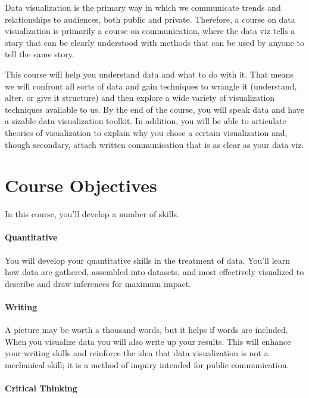 \documentclass[11pt,]{article}
\begin{document}
Data visualization is the primary way in which we communicate trends and
relationships to audiences, both public and private. Therefore, a course
on data visualization is primarily a course on communication, where the
data viz tells a story that can be clearly understood with methods that
can be used by anyone to tell the same story.

This course will help you understand data and what to do with it. That
means we will confront all sorts of data and gain techniques to wrangle
it (understand, alter, or give it structure) and then explore a wide
variety of visualization techniques available to us. By the end of the
course, you will speak data and have a sizable data visualization
toolkit. In addition, you will be able to articulate theories of
visualization to explain why you chose a certain visualization and,
though secondary, attach written communication that is as clear as your
data viz.

\hypertarget{course-objectives}{%
\section{Course Objectives}\label{course-objectives}}

In this course, you'll develop a number of skills.

\hypertarget{quantitative}{%
\paragraph{Quantitative}\label{quantitative}}

You will develop your quantitative skills in the treatment of data.
You'll learn how data are gathered, assembled into datasets, and most
effectively visualized to describe and draw inferences for maximum
impact.

\hypertarget{writing}{%
\paragraph{Writing}\label{writing}}

A picture may be worth a thousand words, but it helps if words are
included. When you visualize data you will also write up your results.
This will enhance your writing skills and reinforce the idea that data
visualization is not a mechanical skill; it is a method of inquiry
intended for public communication.

\hypertarget{critical-thinking}{%
\paragraph{Critical Thinking}\label{critical-thinking}}
\end{document}
